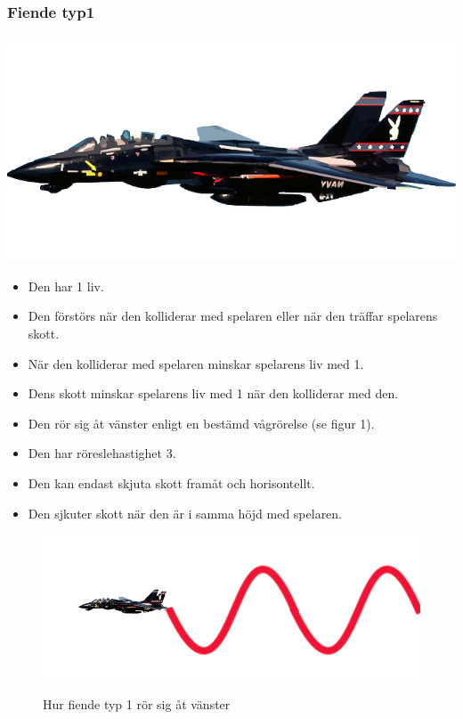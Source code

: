 \documentclass{TDP005mall}
\begin{document}
\subsubsection*{Fiende typ1}
\includegraphics[scale=0.15]{Images/Enemy1.png}
\begin{itemize}
\item Den har 1 liv.
\item Den förstörs när den kolliderar med spelaren eller när den träffar spelarens skott.
\item När den kolliderar med spelaren minskar spelarens liv med 1.
\item Dens skott minskar spelarens liv med 1 när den kolliderar med den.
\item Den rör sig åt vänster enligt en bestämd vågrörelse (se figur 1).
\item Den har röreslehastighet 3.
\item Den kan endast skjuta skott framåt och horisontellt.
\item Den sjkuter skott när den är i samma höjd med spelaren.
\end{itemize}
\begin{figure}[h!]
  \centering
  \includegraphics[scale=0.4]{Images/Enemy1-movement.png}
  \label{Bild 1}
  \caption{Hur fiende typ 1 rör sig åt vänster}
\end{figure}
\end{document}
